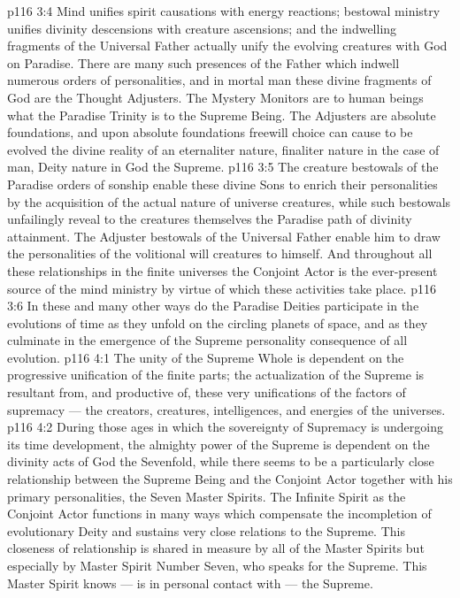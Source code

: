 \vs p116 3:4 \bibnobreakspace {} Mind unifies spirit causations with energy reactions; bestowal ministry unifies divinity descensions with creature ascensions; and the indwelling fragments of the Universal Father actually unify the evolving creatures with God on Paradise. There are many such presences of the Father which indwell numerous orders of personalities, and in mortal man these divine fragments of God are the Thought Adjusters. The Mystery Monitors are to human beings what the Paradise Trinity is to the Supreme Being. The Adjusters are absolute foundations, and upon absolute foundations freewill choice can cause to be evolved the divine reality of an eternaliter nature, finaliter nature in the case of man, Deity nature in God the Supreme.
\vs p116 3:5 \pc The creature bestowals of the Paradise orders of sonship enable these divine Sons to enrich their personalities by the acquisition of the actual nature of universe creatures, while such bestowals unfailingly reveal to the creatures themselves the Paradise path of divinity attainment. The Adjuster bestowals of the Universal Father enable him to draw the personalities of the volitional will creatures to himself. And throughout all these relationships in the finite universes the Conjoint Actor is the ever\hyp{}present source of the mind ministry by virtue of which these activities take place.
\vs p116 3:6 In these and many other ways do the Paradise Deities participate in the evolutions of time as they unfold on the circling planets of space, and as they culminate in the emergence of the Supreme personality consequence of all evolution.
\vs p116 4:1 The unity of the Supreme Whole is dependent on the progressive unification of the finite parts; the actualization of the Supreme is resultant from, and productive of, these very unifications of the factors of supremacy --- the creators, creatures, intelligences, and energies of the universes.
\vs p116 4:2 \pc During those ages in which the sovereignty of Supremacy is undergoing its time development, the almighty power of the Supreme is dependent on the divinity acts of God the Sevenfold, while there seems to be a particularly close relationship between the Supreme Being and the Conjoint Actor together with his primary personalities, the Seven Master Spirits. The Infinite Spirit as the Conjoint Actor functions in many ways which compensate the incompletion of evolutionary Deity and sustains very close relations to the Supreme. This closeness of relationship is shared in measure by all of the Master Spirits but especially by Master Spirit Number Seven, who speaks for the Supreme. This Master Spirit knows --- is in personal contact with --- the Supreme.
